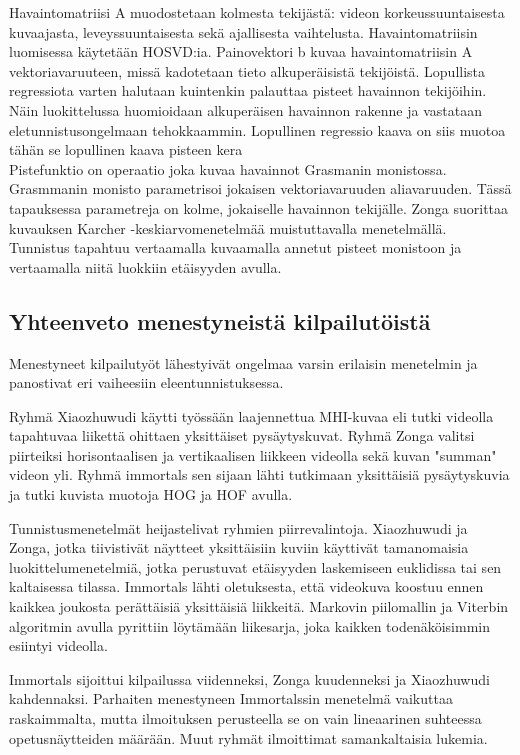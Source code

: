 Havaintomatriisi A muodostetaan kolmesta tekijästä: videon korkeussuuntaisesta kuvaajasta, leveyssuuntaisesta sekä ajallisesta vaihtelusta.
Havaintomatriisin luomisessa käytetään HOSVD:ia. Painovektori b kuvaa havaintomatriisin A vektoriavaruuteen, missä kadotetaan tieto alkuperäisistä tekijöistä. 
Lopullista regressiota varten halutaan kuintenkin palauttaa pisteet havainnon tekijöihin.
Näin luokittelussa huomioidaan alkuperäisen havainnon rakenne ja vastataan eletunnistusongelmaan tehokkaammin. 
Lopullinen regressio kaava on siis muotoa\\
tähän se lopullinen kaava pisteen kera\\
Pistefunktio on operaatio joka kuvaa havainnot Grasmanin monistossa. Grasmmanin monisto parametrisoi jokaisen vektoriavaruuden aliavaruuden.
Tässä tapauksessa parametreja on kolme, jokaiselle havainnon tekijälle.
Zonga suorittaa kuvauksen Karcher -keskiarvomenetelmää muistuttavalla menetelmällä.\\

Tunnistus tapahtuu vertaamalla kuvaamalla annetut pisteet monistoon ja vertaamalla niitä luokkiin etäisyyden avulla. \citep {6239180}\\


\subsection{Yhteenveto menestyneistä kilpailutöistä}
Menestyneet kilpailutyöt lähestyivät ongelmaa varsin erilaisin menetelmin ja panostivat eri vaiheesiin eleentunnistuksessa.
 
Ryhmä Xiaozhuwudi käytti työssään laajennettua MHI-kuvaa eli tutki videolla tapahtuvaa liikettä ohittaen yksittäiset pysäytyskuvat.
Ryhmä Zonga valitsi piirteiksi horisontaalisen ja vertikaalisen liikkeen videolla sekä kuvan "summan" videon yli. 
Ryhmä immortals sen sijaan lähti tutkimaan yksittäisiä pysäytyskuvia ja tutki kuvista muotoja HOG ja HOF avulla.

Tunnistusmenetelmät heijastelivat ryhmien piirrevalintoja. Xiaozhuwudi ja Zonga, jotka tiivistivät näytteet 
yksittäisiin kuviin käyttivät tamanomaisia luokittelumenetelmiä, jotka perustuvat etäisyyden laskemiseen euklidissa tai sen kaltaisessa tilassa.
Immortals lähti oletuksesta, että videokuva koostuu ennen kaikkea joukosta perättäisiä yksittäisiä liikkeitä.
Markovin piilomallin ja Viterbin algoritmin avulla pyrittiin löytämään liikesarja, joka kaikken todenäköisimmin esiintyi videolla.

Immortals sijoittui kilpailussa viidenneksi, Zonga kuudenneksi ja Xiaozhuwudi kahdennaksi. Parhaiten menestyneen Immortalssin
menetelmä vaikuttaa raskaimmalta, mutta ilmoituksen perusteella se on vain lineaarinen suhteessa opetusnäytteiden määrään.
Muut ryhmät ilmoittimat samankaltaisia lukemia.






















